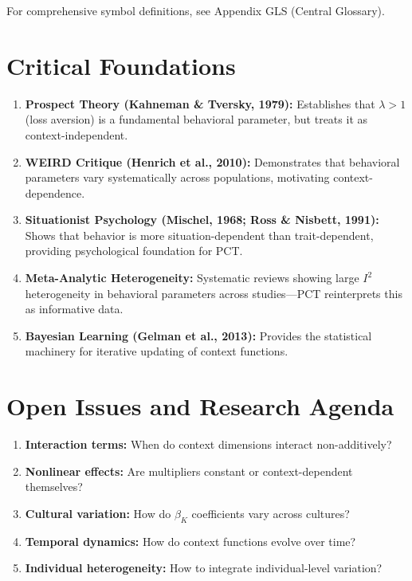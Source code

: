 For comprehensive symbol definitions, see Appendix GLS (Central Glossary).



\section{Critical Foundations}
\label{sec:pct-foundations}

\begin{enumerate}
    \item \textbf{Prospect Theory (Kahneman \& Tversky, 1979):} Establishes that
    $\lambda > 1$ (loss aversion) is a fundamental behavioral parameter, but treats
    it as context-independent.

    \item \textbf{WEIRD Critique (Henrich et al., 2010):} Demonstrates that behavioral
    parameters vary systematically across populations, motivating context-dependence.

    \item \textbf{Situationist Psychology (Mischel, 1968; Ross \& Nisbett, 1991):}
    Shows that behavior is more situation-dependent than trait-dependent, providing
    psychological foundation for PCT.

    \item \textbf{Meta-Analytic Heterogeneity:} Systematic reviews showing large
    $I^2$ heterogeneity in behavioral parameters across studies---PCT reinterprets
    this as informative data.

    \item \textbf{Bayesian Learning (Gelman et al., 2013):} Provides the statistical
    machinery for iterative updating of context functions.
\end{enumerate}



\section{Open Issues and Research Agenda}

\begin{enumerate}
    \item \textbf{Interaction terms:} When do context dimensions interact non-additively?
    \item \textbf{Nonlinear effects:} Are multipliers constant or context-dependent themselves?
    \item \textbf{Cultural variation:} How do $\beta_K$ coefficients vary across cultures?
    \item \textbf{Temporal dynamics:} How do context functions evolve over time?
    \item \textbf{Individual heterogeneity:} How to integrate individual-level variation?
\end{enumerate}


